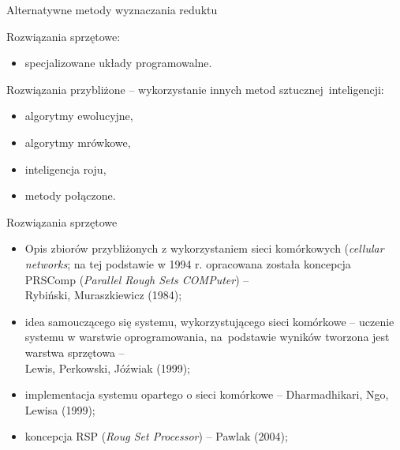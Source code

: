 \documentclass[10pt]{beamer}
\begin{document}
\begin{frame}{Alternatywne metody wyznaczania reduktu}
\begin{spacing}{1.5}
Rozwiązania sprzętowe:\\
\begin{itemize}
\item specjalizowane układy programowalne.
\end{itemize}

Rozwiązania przybliżone -- wykorzystanie innych metod sztucznej~inteligencji:\\
\begin{itemize}
\item algorytmy ewolucyjne,
\item algorytmy mrówkowe,
\item inteligencja roju,
\item metody połączone.
\end{itemize}
\end{spacing}
\end{frame}


\begin{frame}{Rozwiązania sprzętowe}
\begin{spacing}{1.2}
\begin{itemize}
\item Opis zbiorów przybliżonych z wykorzystaniem sieci komórkowych (\textit{cellular networks}; na tej podstawie w 1994 r. opracowana została koncepcja PRSComp (\textit{Parallel Rough Sets COMPuter}) --\\Rybiński, Muraszkiewicz (1984);
\item idea samouczącego się systemu, wykorzystującego sieci komórkowe -- uczenie systemu w warstwie oprogramowania, na~podstawie wyników tworzona jest warstwa sprzętowa --\\Lewis, Perkowski, Jóźwiak (1999);
\item implementacja systemu opartego o sieci komórkowe -- Dharmadhikari, Ngo, Lewisa (1999);
\item koncepcja RSP (\textit{Roug Set Processor}) -- Pawlak (2004);
\end{itemize}
\end{spacing}
\end{frame}
\end{document}
